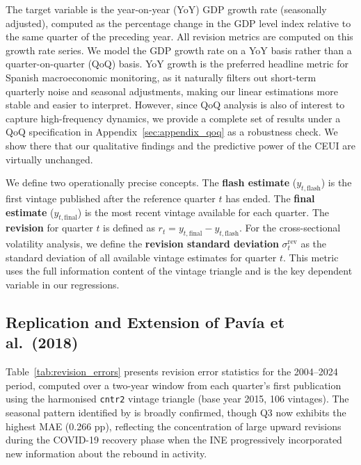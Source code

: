 \documentclass[12pt,a4paper]{article}
\theoremstyle{remark}
\begin{document}
The target variable is the year-on-year (YoY) GDP growth rate (seasonally adjusted), computed as the percentage change in the GDP level index relative to the same quarter of the preceding year. All revision metrics are computed on this growth rate series. We model the GDP growth rate on a YoY basis rather than a quarter-on-quarter (QoQ) basis. YoY growth is the preferred headline metric for Spanish macroeconomic monitoring, as it naturally filters out short-term quarterly noise and seasonal adjustments, making our linear estimations more stable and easier to interpret. However, since QoQ analysis is also of interest to capture high-frequency dynamics, we provide a complete set of results under a QoQ specification in Appendix~\ref{sec:appendix_qoq} as a robustness check. We show there that our qualitative findings and the predictive power of the CEUI are virtually unchanged.

We define two operationally precise concepts. The \textbf{flash estimate} ($y_{t,\text{flash}}$) is the first vintage published after the reference quarter $t$ has ended. The \textbf{final estimate} ($y_{t,\text{final}}$) is the most recent vintage available for each quarter. The \textbf{revision} for quarter $t$ is defined as $r_t = y_{t,\text{final}} - y_{t,\text{flash}}$. For the cross-sectional volatility analysis, we define the \textbf{revision standard deviation} $\sigma^{\text{rev}}_t$ as the standard deviation of all available vintage estimates for quarter $t$. This metric uses the full information content of the vintage triangle and is the key dependent variable in our regressions.

\subsection{Replication and Extension of Pav\'ia et al.\ (2018)}
\label{sec:pavia_results}

Table~\ref{tab:revision_errors} presents revision error statistics for the 2004--2024 period, computed over a two-year window from each quarter's first publication using the harmonised \texttt{cntr2} vintage triangle (base year 2015, 106 vintages). The seasonal pattern identified by \citet{pavia2018} is broadly confirmed, though Q3 now exhibits the highest MAE (0.266 pp), reflecting the concentration of large upward revisions during the COVID-19 recovery phase when the INE progressively incorporated new information about the rebound in activity.


\end{document}
